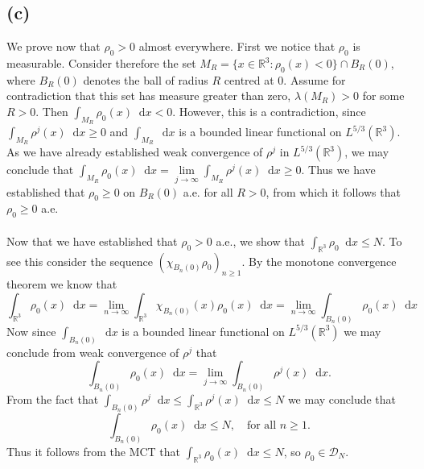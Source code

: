 \documentclass[a4paper,11pt]{article}
\newcommand*\diff{\mathop{}\!\mathrm{d}}
\newcommand{\R}{\mathbb{R}}
\numberwithin{equation}{section}
\begin{document}
\subsection*{(c)}
We prove now that $ \rho_0>0 $ almost everywhere. First we notice that $ \rho_0 $ is measurable. Consider therefore the set $ M_R=\{x\in\R^3 : \rho_0(x)<0\}\cap B_R(0) $, where $ B_R(0) $ denotes the ball of radius $ R $ centred at $ 0 $. Assume for contradiction that this set has measure greater than zero, $ \lambda(M_R)>0 $ for some $ R>0 $. Then $ \int_{M_R}\rho_0(x) \diff x <0$. However, this is a contradiction, since $ \int_{M_R}\rho^j(x) \diff x\geq0 $ and $ \int_{M_R} \diff x $ is a bounded linear functional on $ L^{5/3}(\R^3) $. As we have already established weak convergence of $ \rho^j $ in $ L^{5/3}(\R^3) $, we may conclude that $ \int_{M_R}\rho_0(x) \diff x=\lim\limits_{j\to\infty}\int_{M_R}\rho^j(x) \diff x\geq0 $. Thus we have established that $ \rho_0\geq0 $ on $ B_R(0) $ a.e. for all $ R>0 $, from which it follows that $ \rho_0\geq0 $ a.e.\\
\\
Now that we have established that $ \rho_0>0 $ a.e., we show that $ \int_{\R^3}\rho_0 \diff x \leq N $. To see this consider the sequence $( \chi_{B_n(0)}\rho_0)_{n\geq1} $. By the monotone convergence theorem we know that \begin{equation}
\int_{\R^3}\rho_0(x) \diff x=\lim\limits_{n\to\infty}\int_{\R^3}\chi_{B_n(0)}(x)\rho_0(x) \diff x=\lim\limits_{n\to\infty}\int_{B_n(0)}\rho_0(x)\diff x
\end{equation}
Now since $ \int_{B_n(0)}\diff x $ is a bounded linear functional on $ L^{5/3}(\R^3) $ we may conclude from weak convergence of $ \rho^j $ that \begin{equation}
\int_{B_n(0)}\rho_0(x)\diff x=\lim\limits_{j\to\infty}\int_{B_n(0)}\rho^j(x)\diff x.
\end{equation}
From the fact that $ \int_{B_n(0)}\rho^j\diff x\leq\int_{\R^3}\rho^j(x)\diff x\leq N $ we may conclude that \begin{equation}
\int_{B_n(0)}\rho_0(x)\diff x\leq N,\quad \text{for all }n\geq1.
\end{equation}
Thus it follows from the MCT that $ \int_{\R^3}\rho_0(x)\diff x\leq N $, so $ \rho_0\in\mathcal{D}_N $.
\end{document}
